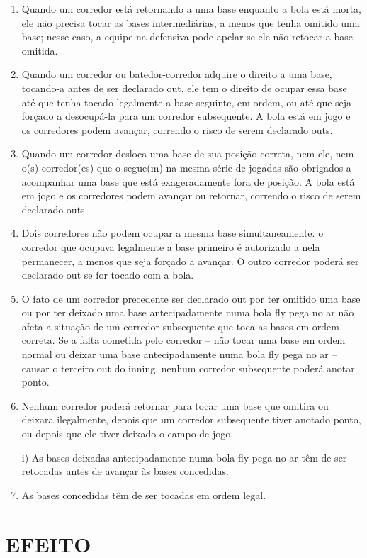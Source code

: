 \begin{enumerate}[label=(\alph*)]
	\item  Quando um corredor está retornando a uma base enquanto a bola está morta, ele não precisa tocar as bases intermediárias, a menos que tenha omitido uma base; nesse caso, a equipe na defensiva pode apelar se ele não retocar a base omitida.
	\item  Quando um corredor ou batedor-corredor adquire o direito a uma base, tocando-a antes de ser declarado \gls{out}, ele tem o direito de ocupar essa base  até que tenha tocado legalmente a base seguinte, em ordem, ou até que seja  forçado a desocupá-la para um corredor subsequente. A bola está em jogo e os  corredores podem avançar, correndo o risco de serem declarado \gls{out}s.
	\item  Quando um corredor desloca uma base de sua posição correta, nem ele, nem  o(s) corredor(es) que o segue(m) na mesma série de jogadas são obrigados a  acompanhar uma base que está exageradamente fora de posição. A bola está em jogo e os corredores podem avançar ou retornar, correndo o risco de serem declarado \gls{out}s.
	\item  Dois corredores não podem ocupar a mesma base simultaneamente. o corredor que ocupava legalmente a base primeiro é autorizado a nela permanecer, a menos que seja forçado a avançar. O outro corredor poderá ser declarado \gls{out} se for tocado com a bola.
	\item   O fato de um corredor precedente ser declarado \gls{out} por ter omitido uma base ou por ter deixado uma base antecipadamente numa bola \gls{fly} pega no ar não afeta a situação de um corredor subsequente que toca as bases em ordem correta. Se a falta cometida pelo corredor -- não tocar uma base em ordem normal ou deixar uma base antecipadamente numa bola \gls{fly} pega no ar -- causar o terceiro \gls{out} do \gls{inning}, nenhum corredor subsequente poderá
	 anotar ponto.
	\item   Nenhum corredor poderá retornar para tocar uma base que omitira ou deixara ilegalmente, depois que um corredor subsequente tiver anotado ponto, ou depois  que ele tiver deixado o campo de jogo.

	 i) As bases deixadas antecipadamente numa bola \gls{fly} pega no ar têm de ser retocadas antes de avançar às bases concedidas.

	\item   As bases concedidas têm de ser tocadas em ordem legal.
\end{enumerate}

\section*{EFEITO}

